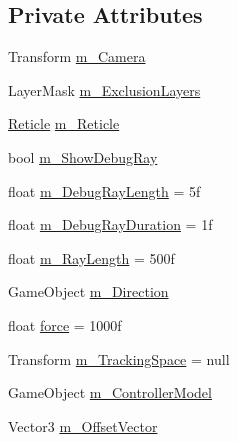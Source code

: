 \subsection*{Private Attributes}
\begin{DoxyCompactItemize}
\item 
Transform \mbox{\hyperlink{class_v_r_standard_assets_1_1_utils_1_1_raycaster_v_r_a31175f7387fee9ad2c589980f8fb208b}{m\+\_\+\+Camera}}
\item 
Layer\+Mask \mbox{\hyperlink{class_v_r_standard_assets_1_1_utils_1_1_raycaster_v_r_a1d35cc7d2ca61987f02ec95f8fad7fa1}{m\+\_\+\+Exclusion\+Layers}}
\item 
\mbox{\hyperlink{class_v_r_standard_assets_1_1_utils_1_1_reticle}{Reticle}} \mbox{\hyperlink{class_v_r_standard_assets_1_1_utils_1_1_raycaster_v_r_a2550a8e10afb25305545ddbaaa262b6c}{m\+\_\+\+Reticle}}
\item 
bool \mbox{\hyperlink{class_v_r_standard_assets_1_1_utils_1_1_raycaster_v_r_aa4960007d414cecc535ce5b23943d24a}{m\+\_\+\+Show\+Debug\+Ray}}
\item 
float \mbox{\hyperlink{class_v_r_standard_assets_1_1_utils_1_1_raycaster_v_r_a10e84a6cc342262543703474063a477e}{m\+\_\+\+Debug\+Ray\+Length}} = 5f
\item 
float \mbox{\hyperlink{class_v_r_standard_assets_1_1_utils_1_1_raycaster_v_r_a3de25fdc1c66f09bb08916fa8f974371}{m\+\_\+\+Debug\+Ray\+Duration}} = 1f
\item 
float \mbox{\hyperlink{class_v_r_standard_assets_1_1_utils_1_1_raycaster_v_r_ac8a6f36aeb0994c4a02cf61bf9ef6a69}{m\+\_\+\+Ray\+Length}} = 500f
\item 
Game\+Object \mbox{\hyperlink{class_v_r_standard_assets_1_1_utils_1_1_raycaster_v_r_a81006ae23a74ee04b8a8ea55ba30ed33}{m\+\_\+\+Direction}}
\item 
float \mbox{\hyperlink{class_v_r_standard_assets_1_1_utils_1_1_raycaster_v_r_a27a44b2b0607f850cecccc8e511c9eba}{force}} = 1000f
\item 
Transform \mbox{\hyperlink{class_v_r_standard_assets_1_1_utils_1_1_raycaster_v_r_a3c79624027b0bd0f129e49dc3a9662be}{m\+\_\+\+Tracking\+Space}} = null
\item 
Game\+Object \mbox{\hyperlink{class_v_r_standard_assets_1_1_utils_1_1_raycaster_v_r_a6f5ccf9d919b2aecad32fd8c536833be}{m\+\_\+\+Controller\+Model}}
\item 
Vector3 \mbox{\hyperlink{class_v_r_standard_assets_1_1_utils_1_1_raycaster_v_r_a5ade6b07c95cfa98fdcd4a0d8ead854c}{m\+\_\+\+Offset\+Vector}}
\item 

\end{DoxyCompactItemize}
